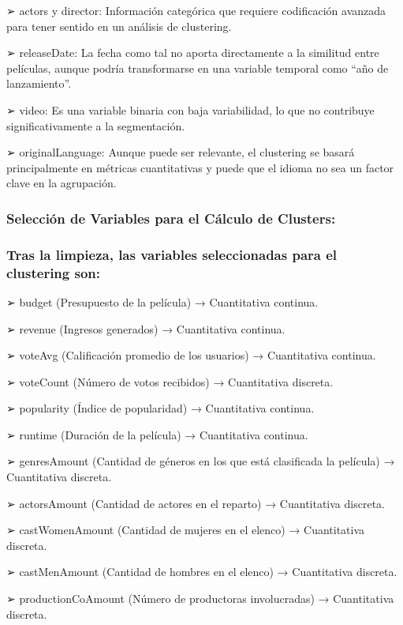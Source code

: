 \documentclass[
]{article}
\begin{document}
➢ actors y director: Información categórica que requiere codificación
avanzada para tener sentido en un análisis de clustering.

➢ releaseDate: La fecha como tal no aporta directamente a la similitud
entre películas, aunque podría transformarse en una variable temporal
como ``año de lanzamiento''.

➢ video: Es una variable binaria con baja variabilidad, lo que no
contribuye significativamente a la segmentación.

➢ originalLanguage: Aunque puede ser relevante, el clustering se basará
principalmente en métricas cuantitativas y puede que el idioma no sea un
factor clave en la agrupación.

\subsubsection{Selección de Variables para el Cálculo de
Clusters:}\label{selecciuxf3n-de-variables-para-el-cuxe1lculo-de-clusters}

\subsubsection{Tras la limpieza, las variables seleccionadas para el
clustering
son:}\label{tras-la-limpieza-las-variables-seleccionadas-para-el-clustering-son}

➢ budget (Presupuesto de la película) → Cuantitativa continua.

➢ revenue (Ingresos generados) → Cuantitativa continua.

➢ voteAvg (Calificación promedio de los usuarios) → Cuantitativa
continua.

➢ voteCount (Número de votos recibidos) → Cuantitativa discreta.

➢ popularity (Índice de popularidad) → Cuantitativa continua.

➢ runtime (Duración de la película) → Cuantitativa continua.

➢ genresAmount (Cantidad de géneros en los que está clasificada la
película) → Cuantitativa discreta.

➢ actorsAmount (Cantidad de actores en el reparto) → Cuantitativa
discreta.

➢ castWomenAmount (Cantidad de mujeres en el elenco) → Cuantitativa
discreta.

➢ castMenAmount (Cantidad de hombres en el elenco) → Cuantitativa
discreta.

➢ productionCoAmount (Número de productoras involucradas) → Cuantitativa
discreta.
\end{document}
